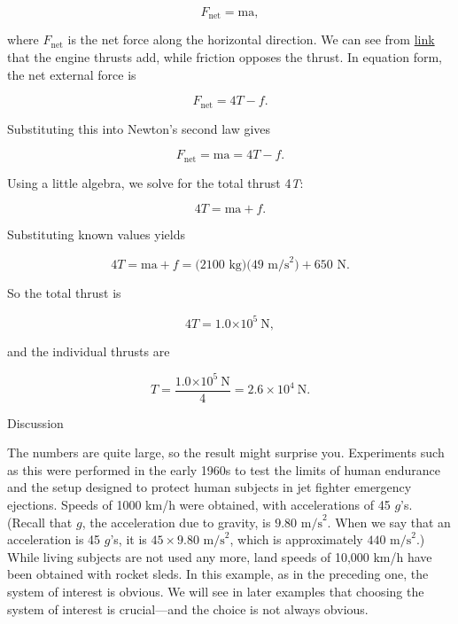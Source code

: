 \documentclass[
]{book}
\newenvironment{tinysection}{}{}
\begin{document}
\leavevmode\hypertarget{eip-id2420800}{}%
\[{F_{\text{net}} = \text{ma}},\]

where \(F_{\text{net}}{}\) is the net force along the horizontal
direction. We can see from \protect\hyperlink{fs-id2407992}{link}
that the engine thrusts add, while friction opposes the thrust. In
equation form, the net external force is

\leavevmode\hypertarget{eip-id1522873}{}%
\[{F_{\text{net}} = {4T - f}}.\]

Substituting this into Newton's second law gives

\leavevmode\hypertarget{eip-id1858333}{}%
\[{{F_{\text{net}} = \text{ma}} = {4T - f}}.\]

Using a little algebra, we solve for the total thrust 4\emph{T}:

\leavevmode\hypertarget{eip-id1948969}{}%
\[{4T = {\text{ma} + f}}.\]

Substituting known values yields

\leavevmode\hypertarget{eip-id2054706}{}%
\[{{{4T = {\text{ma} + f}} = (}\text{2100\ kg})(\text{49\ m/s}^{2}{) + \text{650\ N}}}.\]

So the total thrust is

\leavevmode\hypertarget{eip-id1631559}{}%
\[{{4T = 1.0}{\times \text{10}^{5}}\ \text{N}},\]

and the individual thrusts are

\leavevmode\hypertarget{eip-id1171442277241}{}%
\[{{{T = \frac{1.0{\times \text{10}^{5}}\ \text{N}}{4}} = 2.6 \times \text{10}^{4}}\ \text{N}}.\]

\begin{tinysection}

{Discussion}

\end{tinysection}

The numbers are quite large, so the result might surprise you.
Experiments such as this were performed in the early 1960s to test the
limits of human endurance and the setup designed to protect human
subjects in jet fighter emergency ejections. Speeds of 1000 km/h were
obtained, with accelerations of 45 \(g{}\)'s. (Recall that \(g{}\), the
acceleration due to gravity, is \({9\text{.}\text{80\ m/s}^{2}}{}\). When
we say that an acceleration is 45 \(g{}\)'s, it is
\({\text{45}\times 9\text{.}\text{80\ m/s}^{2}}{}\), which is
approximately \(\text{440\ m/s}^{2}{}\).) While living subjects are not
used any more, land speeds of 10,000 km/h have been obtained with rocket
sleds. In this example, as in the preceding one, the system of interest
is obvious. We will see in later examples that choosing the system of
interest is crucial---and the choice is not always obvious.
\end{document}
